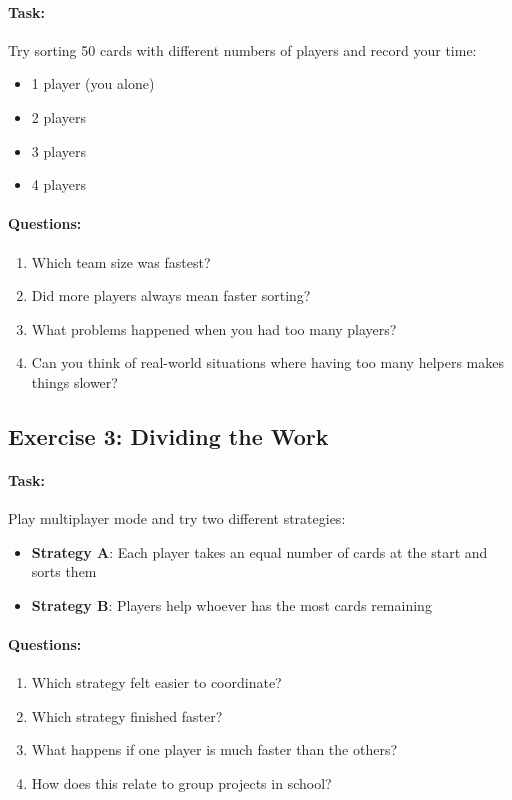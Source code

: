 \paragraph{Task:}

Try sorting 50 cards with different numbers of players and record your time:
\begin{itemize}
    \item 1 player (you alone)
    \item 2 players
    \item 3 players
    \item 4 players
\end{itemize}

\paragraph{Questions:}
\begin{enumerate}
    \item Which team size was fastest?
    \item Did more players always mean faster sorting?
    \item What problems happened when you had too many players?
    \item Can you think of real-world situations where having too many helpers makes things slower?
\end{enumerate}

\subsection{Exercise 3: Dividing the Work}

\paragraph{Task:}

Play multiplayer mode and try two different strategies:
\begin{itemize}
    \item \textbf{Strategy A}: Each player takes an equal number of cards at the start and sorts them
    \item \textbf{Strategy B}: Players help whoever has the most cards remaining
\end{itemize}

\paragraph{Questions:}
\begin{enumerate}
    \item Which strategy felt easier to coordinate?
    \item Which strategy finished faster?
    \item What happens if one player is much faster than the others?
    \item How does this relate to group projects in school?
\end{enumerate}

